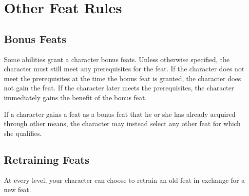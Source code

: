 \section{Other Feat Rules}

    \subsection{Bonus Feats}
        Some abilities grant a character bonus feats.
        Unless otherwise specified, the character must still meet any prerequisites for the feat.
        If the character does not meet the prerequisites at the time the bonus feat is granted, the character does not gain the feat.
        If the character later meets the prerequisites, the character immediately gains the benefit of the bonus feat.

        If a character gains a feat as a bonus feat that he or she has already acquired through other means, the character may instead select any other feat for which she qualifies.

    \subsection{Retraining Feats}
        At every level, your character can choose to retrain an old feat in exchange for a new feat.

